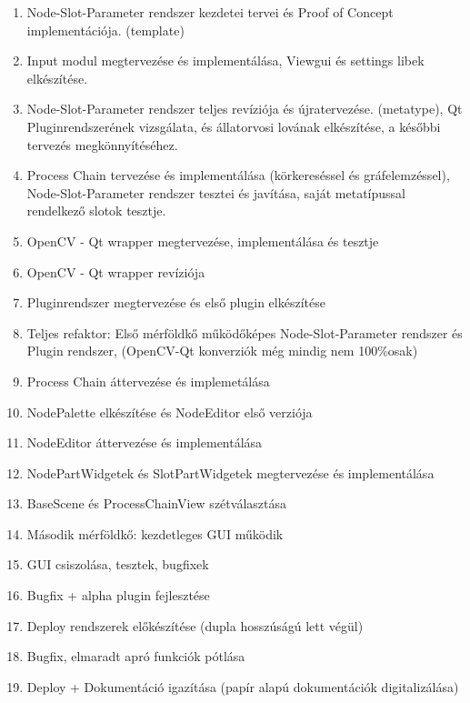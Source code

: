 \documentclass[a4paper,12pt,oneside]{report}
\begin{document}
\begin{enumerate}
\itemsep0em
\item Node-Slot-Parameter rendszer kezdetei tervei és Proof of Concept implementációja. (template)
\item Input modul megtervezése és implementálása, Viewgui és settings libek elkészítése.
\item Node-Slot-Parameter rendszer teljes revíziója és újratervezése. (metatype), Qt Pluginrendszerének vizsgálata, és állatorvosi lovának elkészítése, a későbbi tervezés megkönnyítéséhez.
\item Process Chain tervezése és implementálása (körkereséssel és gráfelemzéssel), Node-Slot-Parameter rendszer tesztei és javítása, saját metatípussal rendelkező slotok tesztje.
\item OpenCV - Qt wrapper megtervezése, implementálása és tesztje
\item OpenCV - Qt wrapper revíziója
\item Pluginrendszer megtervezése és első plugin elkészítése
\item Teljes refaktor: Első mérföldkő működőképes Node-Slot-Parameter rendszer és Plugin rendszer, (OpenCV-Qt konverziók még mindig nem 100\%osak)
\item Process Chain áttervezése és implemetálása
\item NodePalette elkészítése és NodeEditor első verziója
\item NodeEditor áttervezése és implementálása
\item NodePartWidgetek és SlotPartWidgetek megtervezése és implementálása
\item BaseScene és ProcessChainView szétválasztása
\item Második mérföldkő: kezdetleges GUI működik
\item GUI csiszolása, tesztek, bugfixek
\item Bugfix + alpha plugin fejlesztése
\item Deploy rendszerek előkészítése (dupla hosszúságú lett végül)
\item Bugfix, elmaradt apró funkciók pótlása
\item Deploy + Dokumentáció igazítása (papír alapú dokumentációk digitalizálása)

\end{enumerate}
\end{document}
